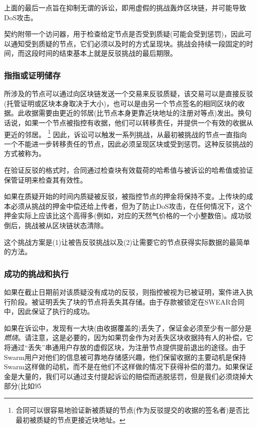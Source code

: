 上面的最后一点旨在抑制无谓的诉讼，即用虚假的挑战轰炸区块链，并可能导致DoS攻击。

契约附带一个访问器，用于检查给定节点是否受到质疑(可能会受到惩罚)，因此可以通知受到质疑的节点，它们必须以及时的方式呈现块。挑战会持续一段固定的时间，而这段时间的结束基本上就是反驳挑战的最后期限。 


\subsubsection{指指或证明储存}


所涉及的节点可以通过向区块链发送一个交易来反驳质疑，该交易可以是直接反驳(托管证明或区块本身取决于大小)，也可以是由另一个节点签名的相同区块的收据。此收据需要由更近的邻居(比节点本身更靠近块地址的注册对等点)发出。换句话说，如果一个节点被指控有收据，他们可以转移责任，并提供一个有效的收据从更近的邻居。%
%
\footnote{合同可以很容易地验证新被质疑的节点(作为反驳提交的收据的签名者)是否比最初被质疑的节点更接近块地址。}
%
因此，诉讼可以触发一系列挑战，从最初被挑战的节点一直指向一个不能进一步转移责任的节点，因此必须呈现区块或受到惩罚。这种反驳挑战的方式被称为。 

在验证反驳的格式时，合同通过检查块有效载荷的哈希值与被诉讼的哈希值或验证保管证明来检查其有效性。 

如果在质疑开始的时间内质疑被反驳，被指控节点的押金将保持不变。上传块的成本必须从挑战的押金中偿还给上传者，但为了防止DoS攻击，在任何情况下，这个押金实际上应该比这个高得多(例如，对应的天然气价格的一个小整数倍)。成功驳倒后，挑战被从区块链状态清除。

这个挑战方案是(1)让被告反驳挑战以及(2)让需要它的节点获得实际数据的最简单的方法。

\subsubsection{成功的挑战和执行}

如果在截止日期前对该质疑没有成功的反驳，则指控被视为已被证明，案件进入执行阶段。被证明丢失了块的节点将丢失其存储。由于存款被锁定在SWEAR合同中，因此保证了执行的成功。

如果在诉讼中，发现有一大块(由收据覆盖的)丢失了，保证金必须至少有一部分是\emph{燃烧}。请注意，这是必要的，因为如果罚金作为对丢失区块收据持有人的补偿，它将通过“丢失”串通用户存放的虚假区块，为注册节点提供提前退出的途径。由于Swarm用户对他们的信息被可靠地存储感兴趣，他们保留收据的主要动机是保持Swarm这样做的动机，而不是在他们不这样做的情况下获得补偿的潜力。如果保证金是大量的，我们可以通过支付提起诉讼的赔偿而逃脱惩罚，但是我们必须烧掉大部分(比如95%

